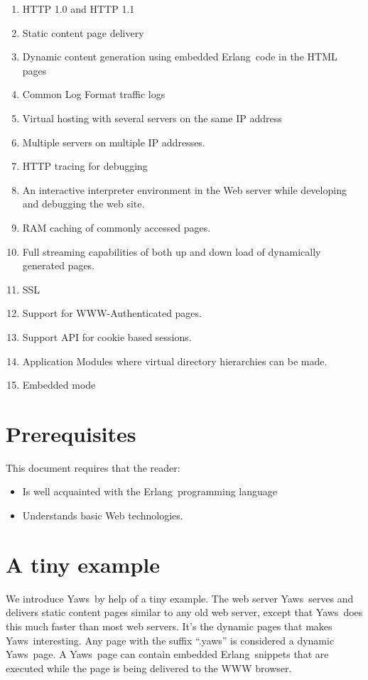 \documentclass[11pt,oneside,english]{book}
\newcommand{\Erlang}            %
        {{\sc Erlang}}
\newcommand{\Yaws}            %
        {{\sc Yaws}}
\begin{document}
\begin{enumerate}
\item HTTP 1.0 and HTTP 1.1
\item Static content page delivery
\item Dynamic content generation using embedded \Erlang\  code in the
HTML pages
\item Common Log Format traffic logs
\item Virtual hosting with several servers on the same IP address
\item Multiple servers on multiple IP addresses.
\item HTTP tracing for debugging
\item An interactive interpreter environment in the Web server while
developing and debugging the web site.
\item RAM caching of commonly accessed pages.
\item Full streaming capabilities of both up and down load of dynamically
generated pages.
\item SSL
\item Support for WWW-Authenticated pages.
\item Support API for cookie based sessions.
\item Application Modules where virtual directory hierarchies can
be made.
\item Embedded mode
\end{enumerate}

\section{Prerequisites}
This document requires that the reader:
\begin{itemize}
\item Is well acquainted with the \Erlang\  programming language
\item Understands basic Web technologies.
\end{itemize}


\section{A tiny example}

We introduce \Yaws\  by help of a tiny example.
 The web server \Yaws\  serves  and delivers
static content pages similar to any old web server, except that \Yaws\  does this
much faster than most web servers. It's the dynamic pages
that makes \Yaws\  interesting. Any page with the suffix ``.yaws'' is considered
a dynamic \Yaws\  page. A \Yaws\  page can contain embedded \Erlang\  snippets that
are executed while the page is being delivered to the WWW browser.
\end{document}
